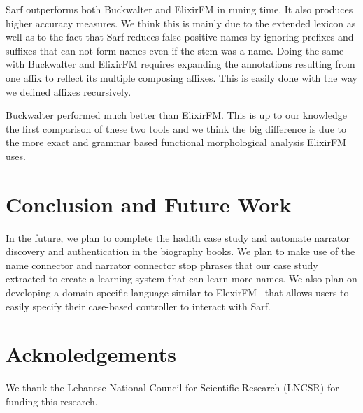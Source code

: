 \documentclass[11pt,letterpaper]{article}
\begin{document}
Sarf outperforms both Buckwalter and ElixirFM in runing time. 
It also produces higher accuracy measures. 
We think this is mainly due to the extended
lexicon as well as to the fact that Sarf reduces false positive
names by ignoring prefixes and suffixes that can not form
names even if the stem was a name. 
Doing the same with Buckwalter and ElixirFM requires  
expanding the annotations resulting from one affix to reflect
its multiple composing affixes.
This is easily done with the way we defined affixes recursively.

Buckwalter performed much better than ElixirFM. This is up to 
our knowledge the first comparison of these two tools and 
we think the big difference is due to the more exact 
and grammar based functional morphological analysis ElixirFM 
uses. 

\section{Conclusion and Future Work}
\label{sec:future}

In the future, we plan to complete the hadith case study 
and automate narrator discovery and authentication in the 
biography books. 
We plan to make use of the name connector and narrator
connector stop phrases that our case study extracted to create a 
learning system that can learn more names. 
We also plan on developing a domain specific language similar 
to ElexirFM~\cite{Otakar:07}
that allows users to easily specify their case-based controller
to interact with Sarf.

\section{Acknoledgements}
\label{sec:acc}
We thank the Lebanese National Council for Scientific Research (LNCSR) for funding this research.



\end{document}
